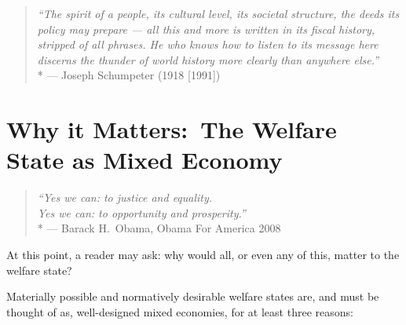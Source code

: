 
\begin{quote}
	\emph{``The spirit of a people, its cultural level, its societal structure, the deeds its policy may prepare --- all this and more is written in its fiscal history, stripped of all phrases.
	He who knows how to listen to its message here discerns the thunder of world history more clearly than anywhere else.''}
	\\*
	--- Joseph Schumpeter (1918 [1991])
\end{quote}




\section{Why it Matters:\ The Welfare State as Mixed Economy} \label{sec:why-mixed-economy-matters}

\begin{quote}
	\emph{``Yes we can:
	to justice and equality.
	\\
	Yes we can:
	to opportunity and prosperity.''}
	\\*
	--- Barack H.\ Obama, Obama For America 2008
\end{quote}



At this point, a reader may ask:
why would all, or even any of this, matter to the welfare state?

Materially possible and normatively desirable welfare states are, and must be thought of as, well-designed mixed economies, for at least three reasons:

